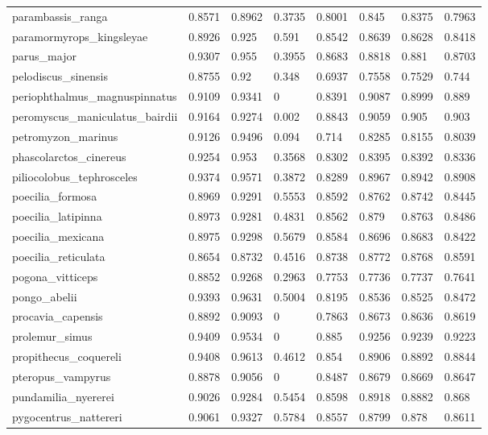 \documentclass{article}
\begin{document}
\begin{table}[!h]
{\begin{tabular}{@{}llllllll@{}}
parambassis\_ranga & 0.8571 & 0.8962 & 0.3735 & 0.8001 & 0.845 & 0.8375 & 0.7963 \\
paramormyrops\_kingsleyae & 0.8926 & 0.925 & 0.591 & 0.8542 & 0.8639 & 0.8628 & 0.8418 \\
parus\_major & 0.9307 & 0.955 & 0.3955 & 0.8683 & 0.8818 & 0.881 & 0.8703 \\
pelodiscus\_sinensis & 0.8755 & 0.92 & 0.348 & 0.6937 & 0.7558 & 0.7529 & 0.744 \\
periophthalmus\_magnuspinnatus & 0.9109 & 0.9341 & 0 & 0.8391 & 0.9087 & 0.8999 & 0.889 \\
peromyscus\_maniculatus\_bairdii & 0.9164 & 0.9274 & 0.002 & 0.8843 & 0.9059 & 0.905 & 0.903 \\
petromyzon\_marinus & 0.9126 & 0.9496 & 0.094 & 0.714 & 0.8285 & 0.8155 & 0.8039 \\
phascolarctos\_cinereus & 0.9254 & 0.953 & 0.3568 & 0.8302 & 0.8395 & 0.8392 & 0.8336 \\
piliocolobus\_tephrosceles & 0.9374 & 0.9571 & 0.3872 & 0.8289 & 0.8967 & 0.8942 & 0.8908 \\
poecilia\_formosa & 0.8969 & 0.9291 & 0.5553 & 0.8592 & 0.8762 & 0.8742 & 0.8445 \\
poecilia\_latipinna & 0.8973 & 0.9281 & 0.4831 & 0.8562 & 0.879 & 0.8763 & 0.8486 \\
poecilia\_mexicana & 0.8975 & 0.9298 & 0.5679 & 0.8584 & 0.8696 & 0.8683 & 0.8422 \\
poecilia\_reticulata & 0.8654 & 0.8732 & 0.4516 & 0.8738 & 0.8772 & 0.8768 & 0.8591 \\
pogona\_vitticeps & 0.8852 & 0.9268 & 0.2963 & 0.7753 & 0.7736 & 0.7737 & 0.7641 \\
pongo\_abelii & 0.9393 & 0.9631 & 0.5004 & 0.8195 & 0.8536 & 0.8525 & 0.8472 \\
procavia\_capensis & 0.8892 & 0.9093 & 0 & 0.7863 & 0.8673 & 0.8636 & 0.8619 \\
prolemur\_simus & 0.9409 & 0.9534 & 0 & 0.885 & 0.9256 & 0.9239 & 0.9223 \\
propithecus\_coquereli & 0.9408 & 0.9613 & 0.4612 & 0.854 & 0.8906 & 0.8892 & 0.8844 \\
pteropus\_vampyrus & 0.8878 & 0.9056 & 0 & 0.8487 & 0.8679 & 0.8669 & 0.8647 \\
pundamilia\_nyererei & 0.9026 & 0.9284 & 0.5454 & 0.8598 & 0.8918 & 0.8882 & 0.868 \\
pygocentrus\_nattereri & 0.9061 & 0.9327 & 0.5784 & 0.8557 & 0.8799 & 0.878 & 0.8611 \\

\end{tabular}}
\end{table}
\end{document}
